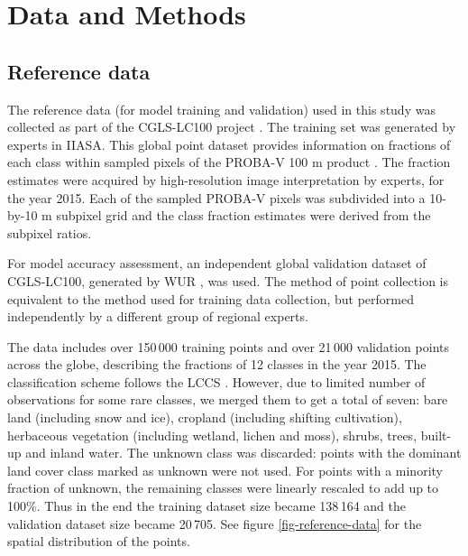 \documentclass[review,authoryear,3p]{elsarticle}
\begin{document}
\section{Data and Methods}

\subsection{Reference data}

The reference data (for model training and validation) used in this study was collected as part of the \ac{CGLS-LC100} project \citep{buchhorn_copernicus_2020, nandin-erdene_tsendbazar_copernicus_2019}.
The training set was generated by experts in \ac{IIASA}.
This global point dataset provides information on fractions of each class within sampled pixels of the PROBA-V 100 m product \citep{dierckx2014probav}.
The fraction estimates were acquired by high-resolution image interpretation by experts, for the year 2015.
Each of the sampled PROBA-V pixels was subdivided into a 10-by-10 m subpixel grid and the class fraction estimates were derived from the subpixel ratios.

For model accuracy assessment, an independent global validation dataset of \ac{CGLS-LC100}, generated by \gls{WUR} \citep{tsendbazar_developing_2018}, was used.
The method of point collection is equivalent to the method used for training data collection, but performed independently by a different group of regional experts.

The data includes over 150\,000 training points and over 21\,000 validation points across the globe, describing the fractions of 12 classes in the year 2015.
The classification scheme follows the \gls{LCCS} \citep{buchhorn_copernicus_2020}.
However, due to limited number of observations for some rare classes, we merged them to get a total of seven: bare land (including snow and ice), cropland (including shifting cultivation), herbaceous vegetation (including wetland, lichen and moss), shrubs, trees, built-up and inland water.
The unknown class was discarded: points with the dominant land cover class marked as unknown were not used.
For points with a minority fraction of unknown, the remaining classes were linearly rescaled to add up to 100\%.
Thus in the end the training dataset size became 138\,164 and the validation dataset size became 20\,705. See figure \ref{fig-reference-data} for the spatial distribution of the points.
\end{document}
